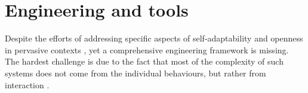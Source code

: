 \documentclass[12pt,a4paper,twoside,openright]{book}
\begin{document}
% 
% 



\section{Engineering and tools}
\label{engineering-and-tools}

Despite the efforts of addressing specific aspects of self-adaptability and openness in pervasive contexts \cite{Mam06,BabaogluPatterns,facets}, yet a comprehensive engineering framework is missing.
%
The hardest challenge is due to the fact that most of the complexity of such systems does not come from the individual behaviours, but rather from interaction \cite{Wegner,interactionbook,interaction-interbook}.
\end{document}
